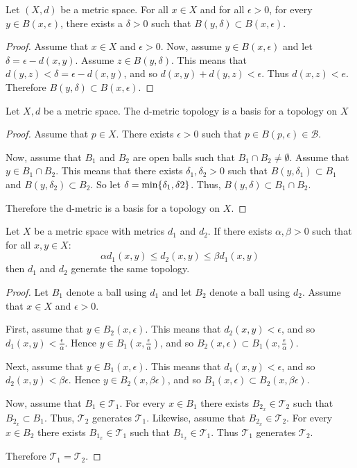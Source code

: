\documentclass[letterpaper,12pt,fleqn]{article}
\newcommand{\B}{\mathcal{B}}
\newcommand{\T}{\mathscr{T}}
\renewcommand{\a}{\alpha}
\renewcommand{\b}{\beta}
\newcommand{\e}{\epsilon}
\renewcommand{\d}{\delta}
\begin{document}
\begin{lemma}
  Let \((X,d)\) be a metric space.  For all \(x\in X\) and for all \(\e>0\), for every \(y\in B(x,\e)\), there
  exists a \(\d>0\) such that \(B(y,\d)\subset B(x,\e)\).
\end{lemma}

\begin{proof}
  Assume that \(x\in X\) and \(\e>0\).  Now, assume \(y\in B(x,\e)\) and let \(\d=\e-d(x,y)\).  Assume
  \(z\in B(y,\d)\).  This means that \(d(y,z)<\d=\e-d(x,y)\), and so \(d(x,y)+d(y,z)<\e\).  Thus
  \(d(x,z)<e\).  Therefore \(B(y,\d)\subset B(x,\e)\).
\end{proof}

\begin{theorem}
  Let \(X,d\) be a metric space.  The d-metric topology is a basis for a topology on \(X\)
\end{theorem}

\begin{proof}
  Assume that \(p\in X\).  There exists \(\e>0\) such that \(p\in B(p,\e)\in\B\).

  Now, assume that \(B_1\) and \(B_2\) are open balls such that \(B_1\cap B_2\ne\emptyset\).  Assume that
  \(y\in B_1\cap B_2\).  This means that there exists \(\d_1,\d_2>0\) such that \(B(y,\d_1)\subset B_1\) and
  \(B(y,\d_2)\subset B_2\).  So let \(\d=\min\set{\d_1,\d2}\).  Thus, \(B(y,\d)\subset B_1\cap B_2\).

  Therefore the d-metric is a basis for a topology on \(X\).
\end{proof}

\begin{lemma}
  Let \(X\) be a metric space with metrics \(d_1\) and \(d_2\).  If there exists \(\a,\b>0\) such that for all
  \(x,y\in X\):
  \[\a d_1(x,y)\le d_2(x,y)\le\b d_1(x,y)\]
  then \(d_1\) and \(d_2\) generate the same topology.
\end{lemma}

\begin{proof}
  Let \(B_1\) denote a ball using \(d_1\) and let \(B_2\) denote a ball using \(d_2\).  Assume that \(x\in X\) and
  \(\e>0\).

  First, assume that \(y\in B_2(x,\e)\).  This means that \(d_2(x,y)<\e\), and so \(d_1(x,y)<\frac{\e}{\a}\).
  Hence \(y\in B_1\left(x,\frac{\e}{\a}\right)\), and so \(B_2(x,\e)\subset B_1\left(x,\frac{\e}{\a}\right)\).

  Next, assume that \(y\in B_1(x,\e)\).  This means that \(d_1(x,y)<\e\), and so \(d_2(x,y)<\b\e\).  Hence
  \(y\in B_2(x,\b\e)\), and so \(B_1(x,\e)\subset B_2(x,\b\e)\).

  Now, assume that \(B_1\in\T_1\).  For every \(x\in B_1\) there exists \(B_{2_x}\in\T_2\) such that
  \(B_{2_x}\subset B_1\).  Thus, \(\T_2\) generates \(\T_1\).  Likewise, assume that \(B_{2_x}\in\T_2\).  For every
  \(x\in B_2\) there exists \(B_{1_x}\in\T_1\) such that \(B_{1_x}\in\T_1\).  Thus \(\T_1\) generates \(\T_2\).

  Therefore \(\T_1=\T_2\).
\end{proof}
\end{document}
